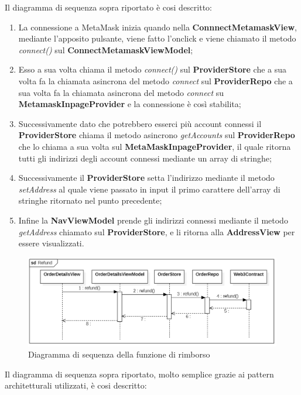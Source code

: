 Il diagramma di sequenza sopra riportato è cosi descritto:

\begin{enumerate}
    \item La connessione a MetaMask inizia quando nella \textbf{ConnnectMetamaskView}, mediante l'apposito pulsante, viene fatto l'onclick e viene chiamato il metodo \textit{connect()} sul \textbf{ConnectMetamaskViewModel};
    \item Esso a sua volta chiama il metodo \textit{connect()} sul \textbf{ProviderStore} che a sua volta fa la chiamata asincrona del metodo \textit{connect} sul \textbf{ProviderRepo} che a sua volta fa la chiamata asincrona del metodo \textit{connect} su \textbf{MetamaskInpageProvider} e la connessione è così stabilita;
    \item Successivamente dato che potrebbero esserci più account connessi il \textbf{ProviderStore} chiama il metodo asincrono \textit{getAccounts} sul \textbf{ProviderRepo} che lo chiama a sua volta sul \textbf{MetaMaskInpageProvider}, il quale ritorna tutti gli indirizzi degli account connessi mediante un array di stringhe;
    \item Successivamente il \textbf{ProviderStore} setta l'indirizzo mediante il metodo \textit{setAddress} al quale viene passato in input il primo carattere dell'array di stringhe ritornato nel punto precedente;
    \item Infine la \textbf{NavViewModel} prende gli indirizzi connessi mediante il metodo \textit{getAddress} chiamato sul \textbf{ProviderStore}, e li ritorna alla \textbf{AddressView} per essere visualizzati.
\end{enumerate}

\begin{figure}[H]
    \centering
    \includegraphics[scale = 0.6]{immagini/refund.png}
    \caption{Diagramma di sequenza della funzione di rimborso}
\end{figure}

Il diagramma di sequenza sopra riportato, molto semplice grazie ai pattern architetturali utilizzati, è cosi descritto:


